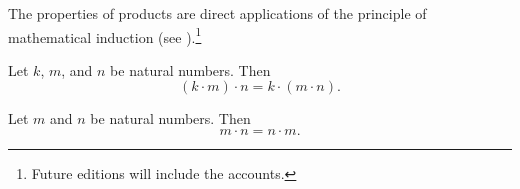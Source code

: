 The properties of products are direct applications of the principle of mathematical induction (see ).\footnote{Future editions will include the accounts.}

\begin{proposition}[Associativity]
Let $k$, $m$, and $n$ be natural numbers. Then
\[
(k \cdot  m) \cdot  n = k \cdot  (m \cdot  n).
\]
\end{proposition}

\begin{proposition}
Let $m$ and $n$ be natural numbers. Then
\[
m \cdot  n = n \cdot  m.
\]
\end{proposition}


